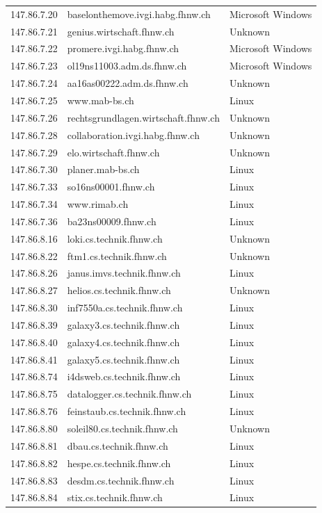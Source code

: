 \documentclass[a4paper,11pt]{scrartcl}
\begin{document}
\begin{longtable}{p{2.5cm}|p{8cm}|l}
	147.86.7.20 & baselonthemove.ivgi.habg.fhnw.ch & Microsoft Windows\\
	147.86.7.21 & genius.wirtschaft.fhnw.ch & Unknown\\
	147.86.7.22 & promere.ivgi.habg.fhnw.ch & Microsoft Windows\\
	147.86.7.23 & ol19ns11003.adm.ds.fhnw.ch & Microsoft Windows\\
	147.86.7.24 & aa16as00222.adm.ds.fhnw.ch & Unknown\\
	147.86.7.25 & www.mab-bs.ch & Linux\\
	147.86.7.26 & rechtsgrundlagen.wirtschaft.fhnw.ch & Unknown\\
	147.86.7.28 & collaboration.ivgi.habg.fhnw.ch & Unknown\\
	147.86.7.29 & elo.wirtschaft.fhnw.ch & Unknown\\
	147.86.7.30 & planer.mab-bs.ch & Linux\\
	147.86.7.33 & so16ns00001.fhnw.ch & Linux\\
	147.86.7.34 & www.rimab.ch & Linux\\
	147.86.7.36 & ba23ns00009.fhnw.ch & Linux\\
	147.86.8.16 & loki.cs.technik.fhnw.ch & Unknown\\
	147.86.8.22 & ftm1.cs.technik.fhnw.ch & Unknown\\
	147.86.8.26 & janus.imvs.technik.fhnw.ch & Linux\\
	147.86.8.27 & helios.cs.technik.fhnw.ch & Unknown\\
	147.86.8.30 & inf7550a.cs.technik.fhnw.ch & Linux\\
	147.86.8.39 & galaxy3.cs.technik.fhnw.ch & Linux\\
	147.86.8.40 & galaxy4.cs.technik.fhnw.ch & Linux\\
	147.86.8.41 & galaxy5.cs.technik.fhnw.ch & Linux\\
	147.86.8.74 & i4dsweb.cs.technik.fhnw.ch & Linux\\
	147.86.8.75 & datalogger.cs.technik.fhnw.ch & Linux\\
	147.86.8.76 & feinstaub.cs.technik.fhnw.ch & Linux\\
	147.86.8.80 & soleil80.cs.technik.fhnw.ch & Unknown\\
	147.86.8.81 & dbau.cs.technik.fhnw.ch & Linux\\
	147.86.8.82 & hespe.cs.technik.fhnw.ch & Linux\\
	147.86.8.83 & desdm.cs.technik.fhnw.ch & Linux\\
	147.86.8.84 & stix.cs.technik.fhnw.ch & Linux\\

\end{longtable}
\end{document}
